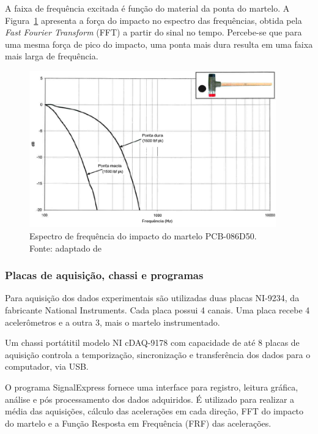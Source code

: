 A faixa de frequência excitada é função do material da ponta do martelo.
A Figura~\ref{fig::carta_badwidth} apresenta a força do impacto no espectro das
frequências, obtida pela \textit{Fast Fourier Transform} (FFT) a partir do sinal
no tempo.
Percebe-se que para uma mesma força de pico do impacto, uma ponta mais dura
resulta em uma faixa mais larga de frequência.

\begin{figure}[h]
	\centering 
 	\includegraphics[width=0.95\textwidth]{figs/carta_badwidth}
 	\caption[Espectro de frequência do impacto do martelo PCB-086D50]{Espectro de
 	frequência do impacto do martelo PCB-086D50. \\	Fonte: adaptado de~\cite{manualpcb} }
 	\label{fig::carta_badwidth}
\end{figure}


\subsubsection{Placas de aquisição, chassi e programas}

Para aquisição dos dados experimentais são utilizadas duas placas NI-9234, da
fabricante National Instruments. Cada placa possui 4 canais. Uma placa recebe 4
acelerômetros e a outra 3, mais o martelo instrumentado.

Um chassi portátitil modelo NI cDAQ-9178 com capacidade de até 8 placas
de aquisição controla a temporização, sincronização e transferência dos dados
para o computador, via USB. 

O programa SignalExpress fornece uma interface para registro, leitura gráfica,
análise e pós processamento dos dados adquiridos. É utilizado para realizar
a média das aquisições, cálculo das acelerações em cada direção, FFT do impacto
do martelo e a Função Resposta em Frequência (FRF) das acelerações.

